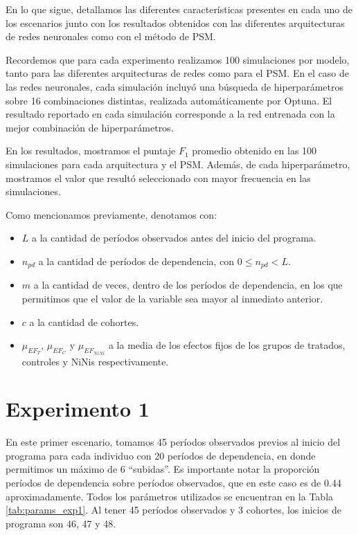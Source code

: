 \documentclass[../main.tex]{subfiles}
\begin{document}
En lo que sigue, detallamos las diferentes características presentes en cada uno de
los escenarios junto con los resultados obtenidos con las diferentes arquitecturas
de redes neuronales como con el método de PSM.

Recordemos que para cada experimento realizamos 100 simulaciones por modelo, tanto para
las diferentes arquitecturas de redes como para el PSM. En el caso de las redes neuronales,
cada simulación incluyó una búsqueda de hiperparámetros sobre 16 combinaciones distintas,
realizada automáticamente por Optuna. El resultado reportado en cada simulación corresponde
a la red entrenada con la mejor combinación de hiperparámetros.

En los resultados, mostramos el puntaje \(F_1\) promedio obtenido en las 100 simulaciones
para cada arquitectura y el PSM. Además, de cada hiperparámetro, mostramos el valor
que resultó seleccionado con mayor frecuencia en las simulaciones.

Como mencionamos previamente, denotamos con:
\begin{itemize}
    \item \(L\) a la cantidad de períodos observados antes del inicio del programa.
    \item \(n_{pd}\) a la cantidad de períodos de dependencia, con \(0 \le n_{pd} < L\).
    \item \(m\) a la cantidad de veces, dentro de los períodos de dependencia, en los que
    permitimos que el valor de la variable sea mayor al inmediato anterior.
    \item \(c\) a la cantidad de cohortes.
    \item \(\mu_{EF_T}\), \(\mu_{EF_C}\) y \(\mu_{EF_{NiNi}}\) a la media de los efectos
    fijos de los grupos de tratados, controles y NiNis respectivamente.
\end{itemize}

\section{Experimento 1}
En este primer escenario, tomamos 45 períodos observados previos al inicio del programa
para cada individuo con 20 períodos de dependencia, en donde permitimos un máximo de 6
``subidas''. Es importante notar la proporción períodos de dependencia sobre períodos
observados, que en este caso es de 0.44 aproximadamente. Todos los parámetros utilizados
se encuentran en la Tabla \ref{tab:params_exp1}. Al tener 45 períodos observados y 3
cohortes, los inicios de programa son 46, 47 y 48.
\end{document}
